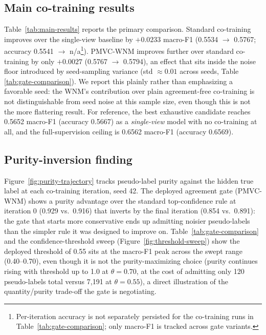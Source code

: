 \documentclass[conference]{IEEEtran}
\begin{document}
\subsection{Main co-training results}
\label{sec:results-main}

Table~\ref{tab:main-results} reports the primary comparison. Standard
co-training improves over the single-view baseline by $+0.0233$ macro-F1
(0.5534 $\to$ 0.5767; accuracy 0.5541 $\to$ n/a\footnote{Per-iteration
accuracy is not separately persisted for the co-training runs in
Table~\ref{tab:gate-comparison}; only macro-F1 is tracked across gate
variants.}). PMVC-WNM improves further over standard co-training by only
$+0.0027$ (0.5767 $\to$ 0.5794), an effect that sits inside the noise floor
introduced by seed-sampling variance (std $\approx 0.01$ across seeds, Table
\ref{tab:gate-comparison}). We report this plainly rather than emphasizing a
favorable seed: the WNM's contribution over plain agreement-free co-training
is not distinguishable from seed noise at this sample size, even though this
is not the more flattering result. For reference, the best exhaustive
candidate reaches 0.5652 macro-F1 (accuracy 0.5667) as a \emph{single-view}
model with no co-training at all, and the full-supervision ceiling is 0.6562
macro-F1 (accuracy 0.6569).

\subsection{Purity-inversion finding}
\label{sec:results-purity}

Figure~\ref{fig:purity-trajectory} tracks pseudo-label purity against the
hidden true label at each co-training iteration, seed 42. The deployed
agreement gate (PMVC-WNM) shows a purity advantage over the standard
top-confidence rule at iteration 0 (0.929 vs.\ 0.916) that inverts by the
final iteration (0.854 vs.\ 0.891): the gate that starts more conservative
ends up admitting noisier pseudo-labels than the simpler rule it was designed
to improve on. Table~\ref{tab:gate-comparison} and the confidence-threshold
sweep (Figure~\ref{fig:threshold-sweep}) show the deployed threshold of 0.55
sits at the macro-F1 peak across the swept range (0.40--0.70), even though it
is not the purity-maximizing choice (purity continues rising with threshold
up to 1.0 at $\theta=0.70$, at the cost of admitting only 120 pseudo-labels
total versus 7{,}191 at $\theta=0.55$), a direct illustration of the
quantity/purity trade-off the gate is negotiating.
\end{document}
